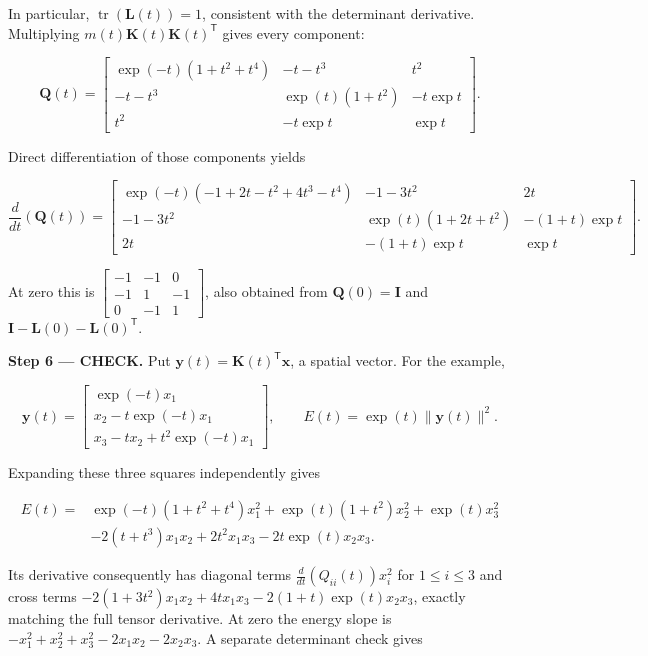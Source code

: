 \documentclass[11pt,oneside,openany]{book}
\begin{document}
In particular, \(\operatorname{tr}(\mathbf L(t))=1\), consistent with the determinant derivative. Multiplying \(m(t)\mathbf K(t)\mathbf K(t)^{\mathsf T}\) gives every component:

\[
\mathbf Q(t)=\begin{bmatrix}
\exp(-t)(1+t^2+t^4)&-t-t^3&t^2\\
-t-t^3&\exp(t)(1+t^2)&-t\exp t\\
t^2&-t\exp t&\exp t
\end{bmatrix}.
\]

Direct differentiation of those components yields

\[
\frac{d}{dt}\left(\mathbf Q(t)\right)=\begin{bmatrix}
\exp(-t)(-1+2t-t^2+4t^3-t^4)&-1-3t^2&2t\\
-1-3t^2&\exp(t)(1+2t+t^2)&-(1+t)\exp t\\
2t&-(1+t)\exp t&\exp t
\end{bmatrix}.
\]

At zero this is \(\begin{bmatrix}-1&-1&0\\-1&1&-1\\0&-1&1\end{bmatrix}\), also obtained from \(\mathbf Q(0)=\mathbf I\) and \(\mathbf I-\mathbf L(0)-\mathbf L(0)^{\mathsf T}\).

\textbf{Step 6 --- CHECK.} Put \(\mathbf y(t)=\mathbf K(t)^{\mathsf T}\mathbf x\), a spatial vector. For the example,

\[
\mathbf y(t)=\begin{bmatrix}
\exp(-t)x_1\\
x_2-t\exp(-t)x_1\\
x_3-tx_2+t^2\exp(-t)x_1
\end{bmatrix},\qquad E(t)=\exp(t)\|\mathbf y(t)\|^2.
\]

Expanding these three squares independently gives

\[
\begin{aligned}
E(t)={}&\exp(-t)(1+t^2+t^4)x_1^2
+\exp(t)(1+t^2)x_2^2+\exp(t)x_3^2\\
&-2(t+t^3)x_1x_2+2t^2x_1x_3-2t\exp(t)x_2x_3.
\end{aligned}
\]

Its derivative consequently has diagonal terms \(\frac{d}{dt}(Q_{ii}(t))x_i^2\) for \(1\le i\le3\) and cross terms
\(-2(1+3t^2)x_1x_2+4tx_1x_3-2(1+t)\exp(t)x_2x_3\), exactly matching the full tensor derivative. At zero the energy slope is \(-x_1^2+x_2^2+x_3^2-2x_1x_2-2x_2x_3\). A separate determinant check gives
\end{document}
